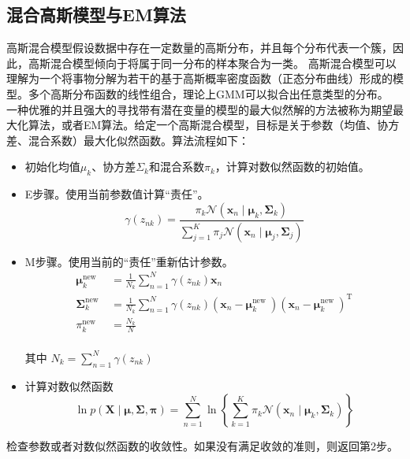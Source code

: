 \documentclass[a4paper,11pt,UTF8]{ctexart}
\begin{document}
\subsection{混合高斯模型与EM算法}
高斯混合模型假设数据中存在一定数量的高斯分布，并且每个分布代表一个簇，因此，高斯混合模型倾向于将属于同一分布的样本聚合为一类。
高斯混合模型可以理解为一个将事物分解为若干的基于高斯概率密度函数（正态分布曲线）形成的模型。多个高斯分布函数的线性组合，理论上GMM可以拟合出任意类型的分布。 \\
一种优雅的并且强大的寻找带有潜在变量的模型的最大似然解的方法被称为期望最大化算法，或者EM算法。给定一个高斯混合模型，目标是关于参数（均值、协方差、混合系数）最大化似然函数。算法流程如下：
\begin{itemize}
	\item 初始化均值$\mu_{k}$、协⽅差$\Sigma_{k}$和混合系数$\pi_{k}$，计算对数似然函数的初始值。
	\item E步骤。使⽤当前参数值计算“责任”。 $$
\gamma\left(z_{n k}\right)=\frac{\pi_{k} \mathcal{N}\left(\boldsymbol{x}_{n} \mid \boldsymbol{\mu}_{k}, \mathbf{\Sigma}_{k}\right)}{\sum_{j=1}^{K} \pi_{j} \mathcal{N}\left(\boldsymbol{x}_{n} \mid \boldsymbol{\mu}_{j}, \mathbf{\Sigma}_{j}\right)}
$$
	\item M步骤。使用当前的“责任”重新估计参数。 $$
\begin{aligned}
\boldsymbol{\mu}_{k}^{\text {new }} &=\frac{1}{N_{k}} \sum_{n=1}^{N} \gamma\left(z_{n k}\right) \mathbf{x}_{n} \\
\boldsymbol{\Sigma}_{k}^{\text {new }} &=\frac{1}{N_{k}} \sum_{n=1}^{N} \gamma\left(z_{n k}\right)\left(\mathbf{x}_{n}-\boldsymbol{\mu}_{k}^{\text {new }}\right)\left(\mathbf{x}_{n}-\boldsymbol{\mu}_{k}^{\text {new }}\right)^{\mathrm{T}} \\
\pi_{k}^{\text {new }} &=\frac{N_{k}}{N}
\end{aligned}
$$ \\
其中 $N_{k} = \sum_{n=1}^{N} \gamma(z_{nk})$
	\item 计算对数似然函数 $$
\ln p(\boldsymbol{X} \mid \boldsymbol{\mu}, \boldsymbol{\Sigma}, \boldsymbol{\pi})=\sum_{n=1}^{N} \ln \left\{\sum_{k=1}^{K} \pi_{k} \mathcal{N}\left(\boldsymbol{x}_{n} \mid \boldsymbol{\mu}_{k}, \boldsymbol{\Sigma}_{k}\right)\right\}
$$
\end{itemize}
检查参数或者对数似然函数的收敛性。如果没有满⾜收敛的准则，则返回第2步。
\end{document}
